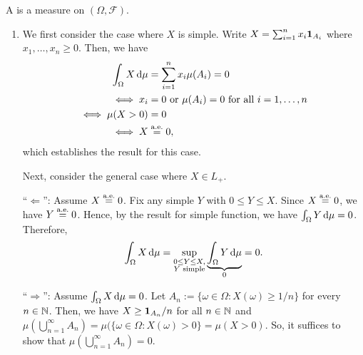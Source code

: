 \begin{enumerate}
\begin{enumerate}
A\in{}\) is a measure on \((\Omega,\mathcal{F})\).
\end{enumerate}
\begin{pf}
\begin{enumerate}
\item We first consider the case where \(X\) is simple. Write
\(X=\sum_{i=1}^{n}x_i\mathbf{1}_{A_i}\) where \(x_1,\dotsc,x_n\ge 0\). Then, we
have
\begin{align*}
\int_{\Omega}^{}X\odif{\mu}&=\sum_{i=1}^{n}x_i\mu(A_i)=0 \\
\iff x_i&=0\text{ or }\mu(A_i)=0\text{ for all \(i=1,\dotsc,n\)} \\
\iff \mu(X>0)&=0 \\
\iff X&\eqae 0,
\end{align*}
which establishes the result for this case.

Next, consider the general case where \(X\in L_{+}\).

``\(\Leftarrow\)'': Assume \(X\overset{\text{a.e.}}= 0\). Fix any simple \(Y\) with \(0\le Y\le
X\). Since \(X\overset{\text{a.e.}}= 0\), we have \(Y\overset{\text{a.e.}}= 0\). Hence, by the result for simple
function, we have \(\int_{\Omega}^{}Y\odif{\mu}=0\). Therefore,
\[\int_{\Omega}^{}X\odif{\mu} =\sup_{\substack{0\le Y\le X,\\ \text{\(Y\)
simple}}} \underbrace{\int_{\Omega}^{}Y\odif{\mu}}_{0} =0.\]

``\(\Rightarrow\)'': Assume \(\int_{\Omega}^{}X\odif{\mu}=0\). Let
\(A_n:=\{\omega\in\Omega:X(\omega)\ge 1/n\}\) for every \(n\in\mathbb{N}\). Then,  we
have \(X\ge \mathbf{1}_{A_n}/n\) for all \(n\in\mathbb{N}\) and
\(\mu(\bigcup_{n=1}^{\infty}A_n)=\mu(\{\omega\in\Omega:X(\omega)>0\}
=\mu(X>0)\). So, it suffices to show that \(\mu(\bigcup_{n=1}^{\infty}A_n)=0\).


\end{enumerate}
\end{pf}
\end{enumerate}
